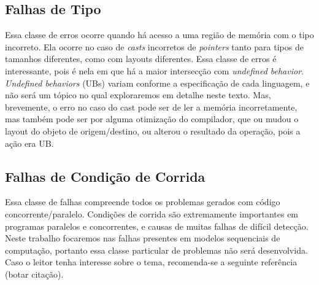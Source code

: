 \subsection{Falhas de Tipo}

Essa classe de erros ocorre quando há acesso a uma região de memória com o tipo incorreto. Ela ocorre no caso de \emph{casts} incorretos de \emph{pointers} tanto para tipos de tamanhos diferentes, como com layouts diferentes. Essa classe de erros é interessante, pois é nela em que há a maior intersecção com \emph{undefined behavior}. \emph{Undefined behaviors} (UBs) variam conforme a especificação de cada linguagem, e não será um tópico no qual exploraremos em detalhe neste texto. Mas, brevemente, o erro no caso do cast pode ser de ler a memória incorretamente, mas também pode ser por alguma otimização do compilador, que ou mudou o layout do objeto de origem/destino, ou alterou o resultado da operação, pois a ação era UB.

\subsection{Falhas de Condição de Corrida}

Essa classe de falhas compreende todos os problemas gerados com código concorrente/paralelo. Condições de corrida são extremamente importantes em programas paralelos e concorrentes, e causas de muitas falhas de difícil detecção. Neste trabalho focaremos nas falhas presentes em modelos sequenciais de computação,   portanto essa classe particular de problemas não será desenvolvida. Caso o leitor tenha interesse sobre o tema, recomenda-se a seguinte referência (botar citação).
